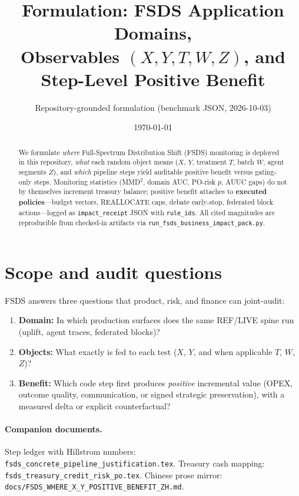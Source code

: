 \documentclass[11pt]{article}
\title{Formulation: FSDS Application Domains,\\[0.25em]
Observables $(X,Y,T,W,Z)$, and Step-Level Positive Benefit}
\author{Repository-grounded formulation (benchmark JSON, 2026-10-03)}
\date{\today}
\begin{document}
\maketitle

\begin{abstract}
We formulate \emph{where} Full-Spectrum Distribution Shift (FSDS) monitoring is deployed in this repository, \emph{what} each random object means ($X$, $Y$, treatment $T$, batch $W$, agent segments $Z$), and \emph{which} pipeline steps yield auditable positive benefit versus gating-only steps.
Monitoring statistics (MMD$^2$, domain AUC, PO-risk $p$, AUUC gaps) do not by themselves increment treasury balance; positive benefit attaches to \textbf{executed policies}---budget vectors, REALLOCATE caps, debate early-stop, federated block actions---logged as \texttt{impact\_receipt} JSON with \texttt{rule\_ids}.
All cited magnitudes are reproducible from checked-in artifacts via \texttt{run\_fsds\_business\_impact\_pack.py}.
\end{abstract}

\tableofcontents

\section{Scope and audit questions}
FSDS answers three questions that product, risk, and finance can joint-audit:
\begin{enumerate}[label=\textbf{Q\arabic*.}]
  \item \textbf{Domain:} In which production surfaces does the same REF/LIVE spine run (uplift, agent traces, federated blocks)?
  \item \textbf{Objects:} What exactly is fed to each test ($X$, $Y$, and when applicable $T$, $W$, $Z$)?
  \item \textbf{Benefit:} Which code step first produces \emph{positive} incremental value (OPEX, outcome quality, communication, or signed strategic preservation), with a measured delta or explicit counterfactual?
\end{enumerate}

\paragraph{Companion documents.}
Step ledger with Hillstrom numbers: \texttt{fsds\_concrete\_pipeline\_justification.tex}.
Treasury cash mapping: \texttt{fsds\_treasury\_credit\_risk\_po.tex}.
Chinese prose mirror: \texttt{docs/FSDS\_WHERE\_X\_Y\_POSITIVE\_BENEFIT\_ZH.md}.
\end{document}

